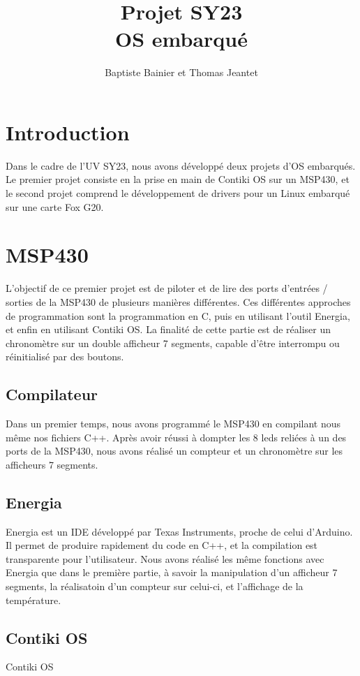 \documentclass[a4paper,12pt]{article}
\author{Baptiste Bainier et Thomas Jeantet}
\title{Projet SY23\\OS embarqué}
\begin{document}
\maketitle
\newpage
\newpage


\section*{Introduction}

Dans le cadre de l'UV SY23, nous avons développé deux projets d'OS embarqués. Le premier projet consiste en la prise en main de Contiki OS sur un MSP430, et le second projet comprend le développement de drivers pour un Linux embarqué sur une carte Fox G20.

\bigskip
\tableofcontents

\newpage
\section{MSP430}
  L'objectif de ce premier projet est de piloter et de lire des ports d'entrées / sorties de la MSP430 de plusieurs manières différentes. Ces différentes approches de programmation sont la programmation en C, puis en utilisant l'outil Energia, et enfin en utilisant Contiki OS. La finalité de cette partie est de réaliser un chronomètre sur un double afficheur 7 segments, capable d'être interrompu ou réinitialisé par des boutons.
  \subsection{Compilateur}
  	Dans un premier temps, nous avons programmé le MSP430 en compilant nous même nos fichiers C++. Après avoir réussi à dompter les 8 leds reliées à un des ports de la MSP430, nous avons réalisé un compteur et un chronomètre sur les afficheurs 7 segments.

  \subsection{Energia}
  	Energia est un IDE développé par Texas Instruments, proche de celui d'Arduino. Il permet de produire rapidement du code en C++, et la compilation est transparente pour l'utilisateur. Nous avons réalisé les même fonctions avec Energia que dans le première partie, à savoir la manipulation d'un afficheur 7 segments, la réalisatoin d'un compteur sur celui-ci, et l'affichage de la température.

  \subsection{Contiki OS}
  	Contiki OS 
\end{document}
